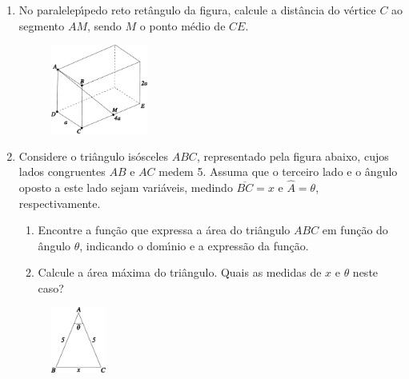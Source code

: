 \documentclass[a4paper,5pt]{amsbook}
\begin{document}
\vspace{1cm}
\begin{enumerate}
    \item No paralelep\'{\i}pedo reto ret\^angulo da figura, calcule a dist\^ancia do
        v\'ertice $C$ ao segmento $AM$, sendo $M$ o ponto m\'edio de $CE$.
        \begin{figure}[!h]
            \centering
            \includegraphics[width=0.3\textwidth]{fig05-1.pdf}
        \end{figure}

    \item Considere o tri\^angulo is\'osceles $ABC$, representado pela figura
        abaixo, cujos lados congruentes $AB$ e $AC$ medem 5. Assuma que o
        terceiro lado e o \^angulo oposto a este lado sejam vari\'aveis, medindo
        $\overline{BC}=x$ e $\hat{A}=\theta$, respectivamente.
        \begin{enumerate}
            \vspace{0.3cm}
            \item Encontre a fun\c{c}\~ao que expressa a \'area do tri\^angulo $ABC$ em
                fun\c{c}\~ao do \^angulo $\theta$, indicando o dom\'{\i}nio e a express\~ao
                da fun\c{c}\~ao.
            \vspace{0.3cm}
            \item Calcule a \'area m\'axima do tri\^angulo. Quais as medidas de $x$ e
                $\theta$ neste caso?
        \end{enumerate}
        \begin{figure}[!h]
            \centering
            \includegraphics[width=0.17\textwidth]{fig05-2.pdf}
        \end{figure}


\end{enumerate}
\end{document}
